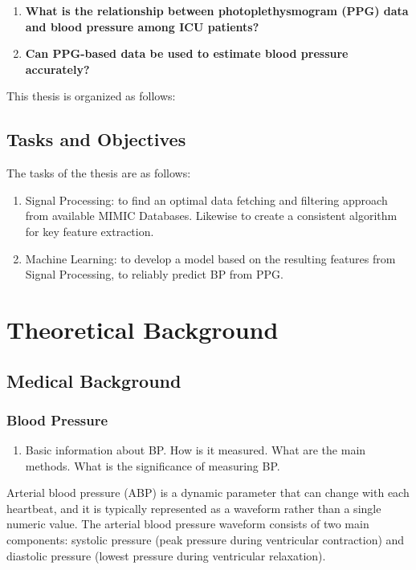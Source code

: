 \documentclass[12pt, bibliography=totoc]{scrartcl}
\begin{document}
\begin{enumerate}
\item \textbf{What is the relationship between photoplethysmogram (PPG) data and blood pressure among ICU patients?}

\item \textbf{Can PPG-based data be used to estimate blood pressure accurately?}

\end{enumerate}

This thesis is organized as follows:

\subsection{Tasks and Objectives}

The tasks of the thesis are as follows:

\begin{enumerate}
\item Signal Processing: to find an optimal data fetching and filtering approach from available MIMIC Databases. Likewise to create a consistent algorithm for key feature extraction.
\item Machine Learning: to develop a model based on the resulting features from Signal Processing, to reliably predict BP from PPG. 
\end{enumerate}

\section{Theoretical Background}

\subsection{Medical Background}

\subsubsection{Blood Pressure}

\begin{enumerate}
\item Basic information about BP. How is it measured. What are the main methods. What is the significance of measuring BP. \cite{WhatBloodPressure2019}
\end{enumerate}

Arterial blood pressure (ABP) is a dynamic parameter that can change with each heartbeat, and it is typically represented as a waveform rather than a single numeric value.
The arterial blood pressure waveform consists of two main components: systolic pressure (peak pressure during ventricular contraction) and diastolic pressure (lowest pressure during ventricular relaxation).
\end{document}

